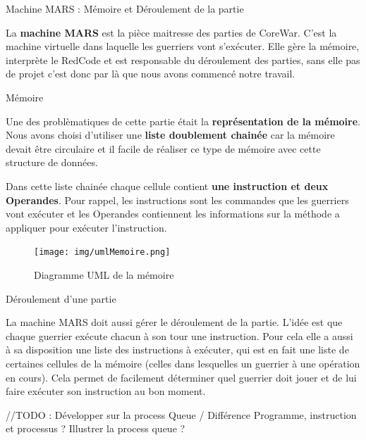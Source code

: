 \documentclass[a4paper, 10pt]{article}
\begin{document}
    \begin{section}{Machine MARS : Mémoire et Déroulement de la partie}
        \par
            La \textbf{machine MARS} est la pièce maitresse des parties de CoreWar. C'est la machine virtuelle dans laquelle les guerriers vont s'exécuter. Elle gère la mémoire, interprète le RedCode et est responsable du déroulement des parties, sans elle pas de projet c'est donc par là que nous avons commencé notre travail. 
            \medskip
        
        \begin{subsection}{Mémoire}
            
            \par
                Une des problèmatiques de cette partie était la \textbf{représentation de la mémoire}.
                Nous avons choisi d'utiliser une \textbf{liste doublement chainée} car la mémoire devait être circulaire et il facile de réaliser ce type de mémoire avec cette structure de données.
                \smallskip
            \par
                Dans cette liste chainée chaque cellule contient \textbf{une instruction et deux Operandes}. Pour rappel, les instructions sont les commandes que les guerriers vont exécuter et les Operandes contiennent les informations sur la méthode a appliquer pour exécuter l'instruction. 
                \medskip

                \begin{figure}
                    \texttt{[image: img/umlMemoire.png]}\label{fig:umlMemoire}
                    \caption{Diagramme UML de la mémoire}
                \end{figure}
        \end{subsection}
        
        \begin{subsection}{Déroulement d'une partie}
            \par
                La machine MARS doit aussi gérer le déroulement de la partie. L'idée est que chaque guerrier exécute chacun à son tour une instruction. Pour cela elle a aussi à sa disposition une liste des instructions à exécuter, qui est en fait une liste de certaines cellules de la mémoire (celles dans lesquelles un guerrier à une opération en cours). Cela permet de facilement déterminer quel guerrier doit jouer et de lui faire exécuter son instruction au bon moment.
            \par
                //TODO : Développer sur la process Queue / Différence Programme, instruction et processus ? Illustrer la process queue ?
        \end{subsection}
        \bigskip
    \end{section}
\end{document}
